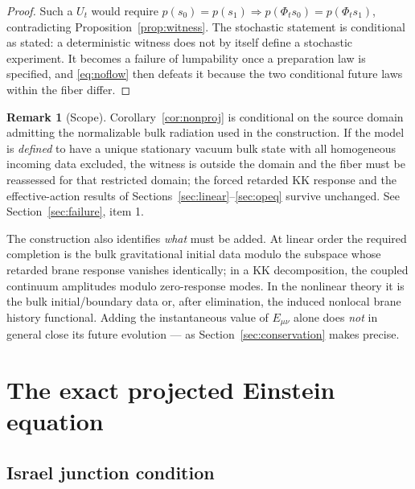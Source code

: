 \documentclass[11pt,a4paper]{article}
\theoremstyle{plain}
\theoremstyle{definition}
\newtheorem{remark}[theorem]{Remark}
\begin{document}
\begin{proof}
Such a $U_t$ would require $p(s_0)=p(s_1)\Rightarrow
p(\Phi_ts_0)=p(\Phi_ts_1)$, contradicting
Proposition~\ref{prop:witness}. The stochastic statement is conditional
as stated: a deterministic witness does not by itself define a stochastic
experiment. It becomes a failure of lumpability once a preparation law is
specified, and \eqref{eq:noflow} then defeats it because the two
conditional future laws within the fiber differ.
\end{proof}

\begin{remark}[Scope]
\label{rem:witnessScope}
Corollary~\ref{cor:nonproj} is conditional on the source domain admitting
the normalizable bulk radiation used in the construction. If the model is
\emph{defined} to have a unique stationary vacuum bulk state with all
homogeneous incoming data excluded, the witness is outside the domain and
the fiber must be reassessed for that restricted domain; the forced
retarded KK response and the effective-action results of
Sections~\ref{sec:linear}--\ref{sec:opeq} survive unchanged. See
Section~\ref{sec:failure}, item 1.
\end{remark}

The construction also identifies \emph{what} must be added. At linear
order the required completion is the bulk gravitational initial data
modulo the subspace whose retarded brane response vanishes identically;
in a KK decomposition, the coupled continuum amplitudes modulo
zero-response modes. In the nonlinear theory it is the bulk
initial/boundary data or, after elimination, the induced nonlocal brane
history functional. Adding the instantaneous value of $E_{\mu\nu}$ alone
does \emph{not} in general close its future evolution --- as
Section~\ref{sec:conservation} makes precise.

\section{The exact projected Einstein equation}
\label{sec:projected}

\subsection{Israel junction condition}
\end{document}
